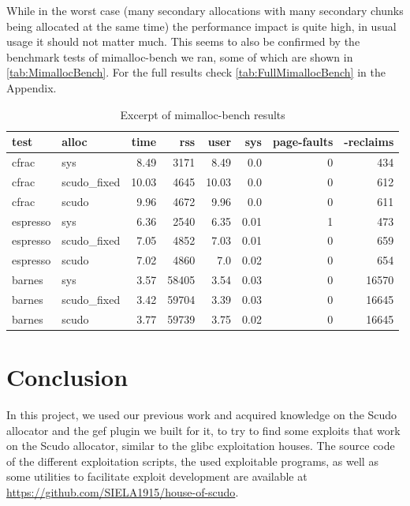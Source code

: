 \documentclass[a4paper,11pt,oneside]{report}
\begin{document}
While in the worst case (many secondary allocations with many secondary chunks being
allocated at the same time) the performance impact is quite high, in usual usage it should
not matter much. This seems to also be confirmed by the benchmark tests of mimalloc-bench
we ran, some of which are shown in \autoref{tab:MimallocBench}. For the full results check
\autoref{tab:FullMimallocBench} in the Appendix.

\begin{longtable}[h]{l l r r r r r r}
  \caption{Excerpt of mimalloc-bench results}\label{tab:MimallocBench} \\

  \toprule
  test & alloc & time & rss & user & sys & page-faults & -reclaims \\
  \midrule
  \endhead{}
  cfrac & sys & 8.49 & 3171 & 8.49 & 0.0 & 0 & 434 \\
  \midrule
  cfrac & scudo\_fixed & 10.03 & 4645 & 10.03 & 0.0 & 0 & 612 \\
  \midrule
  cfrac & scudo & 9.96 & 4672 & 9.96 & 0.0 & 0 & 611 \\
  \midrule
  espresso & sys & 6.36 & 2540 & 6.35 & 0.01 & 1 & 473 \\
  \midrule
  espresso & scudo\_fixed & 7.05 & 4852 & 7.03 & 0.01 & 0 & 659 \\
  \midrule
  espresso & scudo & 7.02 & 4860 & 7.0 & 0.02 & 0 & 654 \\
  \midrule
  barnes & sys & 3.57 & 58405 & 3.54 & 0.03 & 0 & 16570 \\
  \midrule
  barnes & scudo\_fixed & 3.42 & 59704 & 3.39 & 0.03 & 0 & 16645 \\
  \midrule
  barnes & scudo & 3.77 & 59739 & 3.75 & 0.02 & 0 & 16645 \\
  \bottomrule
\end{longtable}


\chapter{Conclusion}

In this project, we used our previous work and acquired knowledge on the Scudo allocator
and the gef plugin we built for it, to try to find some exploits that work on the Scudo
allocator, similar to the glibc exploitation houses. The source code of the different
exploitation scripts, the used exploitable programs, as well as some utilities to
facilitate exploit development are available at
\url{https://github.com/SIELA1915/house-of-scudo}.
\end{document}

